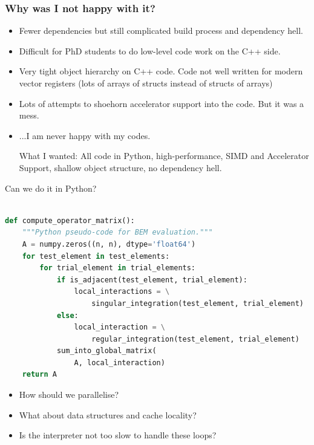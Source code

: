 \documentclass[dvipsnames,10pt]{beamer}
\begin{document}
\begin{frame}
	\frametitle{Why was I not happy with it?}
	
	\vspace{\baselineskip}
	
	\begin{itemize}
	\item Fewer dependencies but still complicated build process and dependency hell.
	\item Difficult for PhD students to do low-level code work on the C++ side.
	\item Very tight object hierarchy on C++ code. Code not well written for modern vector registers
	         (lots of arrays of structs instead of structs of arrays)
	 \item Lots of attempts to shoehorn accelerator support into the code. But it was a mess.
	 \item ...I am never happy with my codes.
	 
	 \begin{tcolorbox}What I wanted: All code in Python, high-performance, SIMD and Accelerator Support,
	 shallow object structure, no dependency hell.
	 \end{tcolorbox}
	 
	 \end{itemize}
\end{frame}
	
\begin{frame}[fragile]{Can we do it in Python?}

{\footnotesize
\begin{lstlisting}[language=Python]

def compute_operator_matrix():
    """Python pseudo-code for BEM evaluation."""
    A = numpy.zeros((n, n), dtype='float64')
    for test_element in test_elements:
        for trial_element in trial_elements:
            if is_adjacent(test_element, trial_element):
                local_interactions = \
                    singular_integration(test_element, trial_element)
            else:
                local_interaction = \
                    regular_integration(test_element, trial_element)
            sum_into_global_matrix(
                A, local_interaction)
    return A
\end{lstlisting}
}
\begin{tcolorbox}
\begin{itemize}
    \item How should we parallelise?
    \item What about data structures and cache locality?
    \item Is the interpreter not too slow to handle these loops?
\end{itemize}
\end{tcolorbox}
	
\end{frame}
\end{document}
